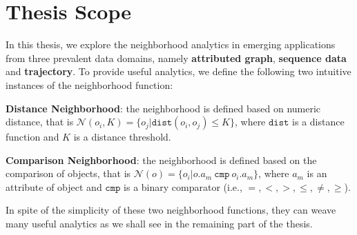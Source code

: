 \section{Thesis Scope}
In this thesis, we explore the neighborhood analytics in emerging applications
from three prevalent data domains, namely \textbf{attributed graph},
\textbf{sequence data} and \textbf{trajectory}. 
To provide useful analytics, we define the following
two intuitive instances of the neighborhood function:

\textbf{Distance Neighborhood}: the neighborhood is defined based on numeric distance, that is $\mathcal{N}(o_i,K) = \{o_j | \mathtt{dist}(o_i,o_j) \leq K \}$, where $\mathtt{dist}$ is a distance function and $K$ is a distance threshold.

\textbf{Comparison Neighborhood}: the neighborhood is defined based on the comparison of objects, that is $\mathcal{N}(o) = \{o_i | o.a_m \ \mathtt{cmp} \ o_i.a_m\}$, where $a_m$ is an attribute of object
and $\mathtt{cmp}$ is a binary comparator (i.e., $=,<,>,\leq,\neq,\geq$).

In spite of the simplicity of these two neighborhood functions, they can weave many useful analytics as we shall see in the remaining part of the thesis.
%

%
%
%


